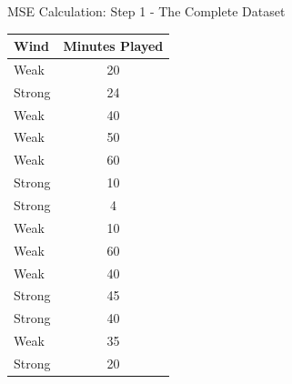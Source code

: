 \documentclass[usenames,dvipsnames]{beamer}
\begin{document}
\begin{frame}{MSE Calculation: Step 1 - The Complete Dataset}
\begin{scriptsize}
\begin{center}
\begin{table}[]
	\begin{tabular}{@{}lc@{}}
		\toprule
		\textbf{Wind} & \textbf{Minutes Played} \\ \midrule
		Weak          & 20                      \\
		Strong        & 24                      \\
		Weak          & 40                      \\
		Weak          & 50                      \\
		Weak          & 60                      \\
		Strong        & 10                      \\
		Strong        & 4                       \\
		Weak          & 10                      \\
		Weak          & 60                      \\
		Weak          & 40                      \\
		Strong        & 45                      \\
		Strong        & 40                      \\
		Weak          & 35                      \\
		Strong        & 20                      \\ \bottomrule
	\end{tabular}
\end{table}
\end{center}

\end{scriptsize}
\end{frame}
\end{document}
